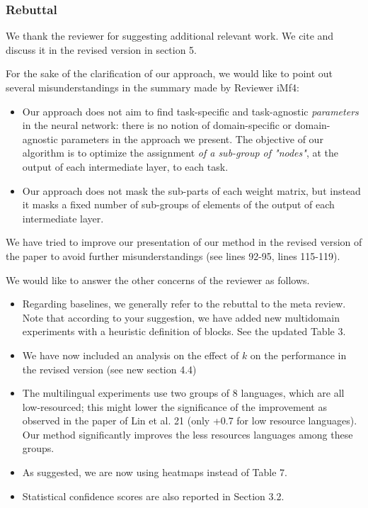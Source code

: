 \documentclass[12pt,times,a4paper,twoside]{article}
\theoremstyle{definition}
\begin{document}
\subsubsection*{Rebuttal}
{\color{blue}%
We thank the reviewer for suggesting additional relevant work. We cite and discuss it in the revised version in section 5.\done{}

For the sake of the clarification of our approach, we would like to point out several misunderstandings in the summary made by Reviewer iMf4:
\begin{itemize}
\item Our approach does not aim to find task-specific and task-agnostic \emph{parameters} in the neural network: there is no notion of domain-specific or domain-agnostic parameters in the approach we present. The objective of our algorithm is to optimize the assignment \emph{of a sub-group of "nodes"}, at the output of each intermediate layer, to each task.
\item Our approach does not mask the sub-parts of each weight matrix, but instead it masks a fixed number of sub-groups of elements of the output of each intermediate layer.
\end{itemize}
We have tried to improve our presentation of our method in the revised version of the paper to avoid further misunderstandings (see lines 92-95, lines 115-119).\done{}

We would like to answer the other concerns of the reviewer as follows. \done{}
\begin{itemize} 
\item Regarding baselines, we generally refer to the rebuttal to the meta review. Note that according to your suggestion, we have added new multidomain experiments with a heuristic definition of blocks. See the updated Table $3$.\done{}
\item We have now included an analysis on the effect of $k$ on the performance in the revised version (see new section 4.4)
\item The multilingual experiments use two groups of $8$ languages, which are all low-resourced; this might lower the significance of the improvement as observed in the paper of Lin et al. 21 (only +0.7 for low resource languages). Our method significantly improves the less resources languages among these groups.
\item As suggested, we are now using heatmaps instead of Table 7.
\item Statistical confidence scores are also reported in Section 3.2. \done{}
\end{itemize}
}
\end{document}
